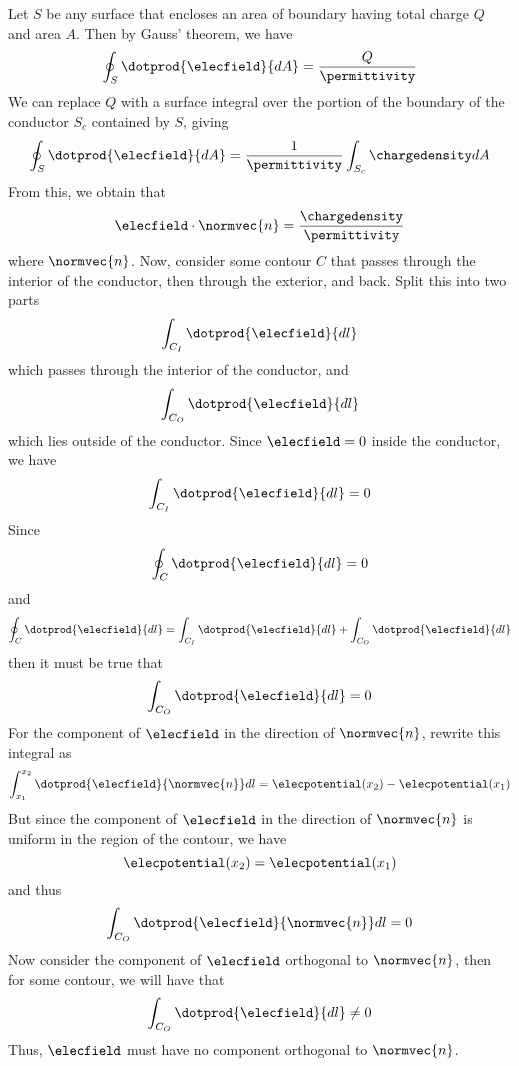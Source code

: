 \begin{itemize}
  Let $S$ be any surface that encloses an area of boundary having
  total charge $Q$ and area $A$.  Then by Gauss' theorem, we have
  \[
  \oint_S \dotprod{\elecfield}{dA} = \frac{Q}{\permittivity}
  \]
  We can replace $Q$ with a surface integral over the portion of the
  boundary of the conductor $S_c$ contained by $S$, giving
  \[
  \oint_S \dotprod{\elecfield}{dA}
  =
  \frac{1}{\permittivity}\int_{S_c}\chargedensity dA
  \]
  From this, we obtain that
  \[
  \elecfield\cdot\normvec{n} = \frac{\chargedensity}{\permittivity}
  \]
  where $\normvec{n}$.  Now, consider some contour $C$ that passes through
  the interior of the conductor, then through the exterior, and back.
  Split this into two parts
  \[
  \int_{C_I} \dotprod{\elecfield}{dl}
  \]
  which passes through the interior of the conductor, and
  \[
  \int_{C_O} \dotprod{\elecfield}{dl}
  \]
  which lies outside of the conductor.  Since $\elecfield = 0$ inside
  the conductor, we have
  \[
  \int_{C_I} \dotprod{\elecfield}{dl} = 0
  \]
  Since
  \[
  \oint_C \dotprod{\elecfield}{dl} = 0
  \]
  and
  \[
  \oint_C \dotprod{\elecfield}{dl}
  =
  \int_{C_I} \dotprod{\elecfield}{dl} +
  \int_{C_O} \dotprod{\elecfield}{dl}
  \]
  then it must be true that
  \[
  \int_{C_O} \dotprod{\elecfield}{dl} = 0
  \]
  For the component of $\elecfield$ in the direction of $\normvec{n}$,
  rewrite this integral as
  \[
  \int_{x_1}^{x_2} \dotprod{\elecfield}{\normvec{n}}dl
  =
  \elecpotential(x_2) - \elecpotential(x_1)
  \]
  But since the component of $\elecfield$ in the direction of
  $\normvec{n}$ is uniform in the region of the contour, we have
  \[
  \elecpotential(x_2) = \elecpotential(x_1)
  \]
  and thus
  \[
  \int_{C_O} \dotprod{\elecfield}{\normvec{n}}dl
  =
  0
  \]
  Now consider the component of $\elecfield$ orthogonal to $\normvec{n}$,
  then for some contour, we will have that
  \[
  \int_{C_O} \dotprod{\elecfield}{dl}
  \neq
  0
  \]
  Thus, $\elecfield$ must have no component orthogonal to $\normvec{n}$.

\end{itemize}
